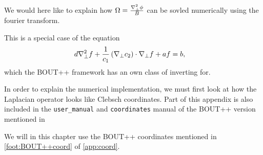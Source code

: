 We would here like to explain how $\Omega = \frac{\nabla_\perp^2\phi}{B}$ can be sovled numerically using the fourier transform.

This is a special case of the equation
%
\begin{align}
    d&\nabla_\perp^2f + \frac{1}{c_1}\left(\nabla_\perp c_2\right)\cdot\nabla_\perp f + af = b,
\label{eq:to_invert_tri}
\end{align}
%
which the BOUT++ framework has an own class of inverting for.

In order to explain the numerical implementation, we must first look at how the Laplacian operator looks like Clebsch coordinates.
Part of this appendix is also included in the \texttt{user\_manual} and \texttt{coordinates} manual of the BOUT++ version mentioned in

We will in this chapter use the BOUT++ coordinates mentioned in \cref{foot:BOUT++coord} of \cref{app:coord}.

